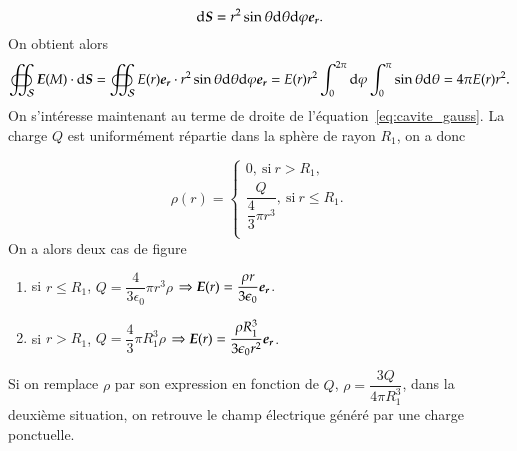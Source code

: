 \begin{equation}
	\ds = r^2 \sin \theta \dtheta \dphi \er.
\end{equation}
On obtient alors
\begin{equation}
	\oiint_\mathcal{S} \vece(M) \cdot \ds = 
	\oiint_\mathcal{S} E(r) \er \cdot r^2 \sin \theta \dtheta \dphi \er
	= E(r) r^2 \int_0^{2 \pi} \dphi \int_0^\pi\sin \theta \dtheta
	= 4 \pi E(r) r^2.
\end{equation}
On s'intéresse maintenant au terme de droite de l'équation~\ref{eq:cavite_gauss}.
La charge $Q$ est uniformément répartie dans la sphère de rayon $R_1$, on a donc

\begin{equation}
	\rho(r) = 
	\left\{
	\begin{array}{l}
		0,\ \mathrm{si} \  r > R_1,\\[1em]
		\dfrac{Q}{\dfrac{4}{3} \pi r^3},\ \mathrm{si} \ r \leq R_1. \\
	\end{array}
	\right.
\end{equation}
On a alors deux cas de figure
\begin{enumerate}
	\item si $r \leq R_1$, $Q = \dfrac{4}{3 \epsilon_0} \pi r^3 \rho$
	  $\Rightarrow \vece(r) = \dfrac{\rho r}{3 \epsilon_0} \er$.
	\item si $r > R_1$, $Q = \dfrac{4}{3} \pi R_1^3 \rho$ 
	  $\Rightarrow \vece(r) = \dfrac{\rho R_1^3}{3 \epsilon_0 r^2} \er$.
\end{enumerate}

\begin{rema}
	Si on remplace $\rho$ par son expression en fonction de $Q$, 
	$\rho = \dfrac{3Q}{4 \pi R_1^3}$, dans la deuxième 
	situation, on retrouve le champ électrique généré par une charge ponctuelle.
\end{rema}
